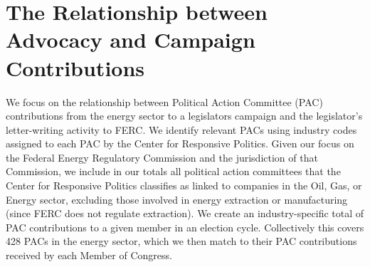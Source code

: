 \documentclass{article}
\begin{document}


\section{The Relationship between Advocacy and Campaign Contributions}

We focus on the relationship between Political Action Committee (PAC) contributions from the energy sector to a legislators campaign and the legislator's letter-writing activity to FERC.  We identify relevant PACs using industry codes assigned to each PAC by the Center for Responsive Politics.  Given our focus on the Federal Energy Regulatory Commission and the jurisdiction of that Commission, we include in our totals all political action committees that the Center for Responsive Politics classifies as linked to companies in the Oil, Gas, or Energy sector, excluding those involved in energy extraction or manufacturing (since FERC does not regulate extraction).  We create an industry-specific total of PAC contributions to a given member in an election cycle.  Collectively this covers 428 PACs in the energy sector, which we then match to their PAC contributions received by each Member of Congress.
 
\end{document}
